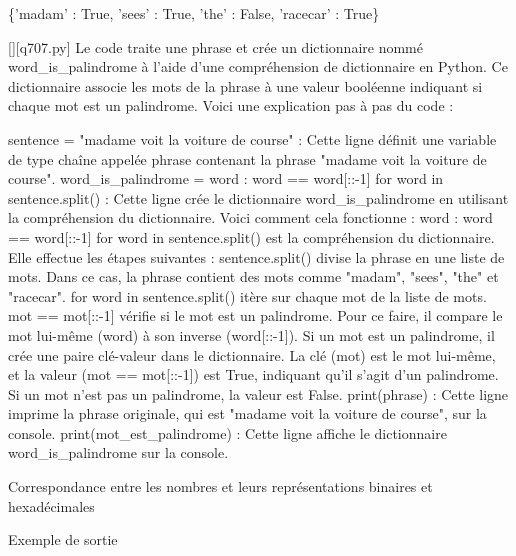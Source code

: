 \{'madam' : True, 'sees' : True, 'the' : False, 'racecar' : True\}
        \par
        \begin{solution}
            \renewcommand{\nomfichier}{q707.py}
            \pythonfile{\chemincode \nomfichier}[][\nomfichier]
            Le code traite une phrase et crée un dictionnaire nommé word_is_palindrome à l'aide d'une compréhension de dictionnaire en Python. Ce dictionnaire associe les mots de la phrase à une valeur booléenne indiquant si chaque mot est un palindrome. Voici une explication pas à pas du code :

    sentence = "madame voit la voiture de course" : Cette ligne définit une variable de type chaîne appelée phrase contenant la phrase "madame voit la voiture de course".
    word_is_palindrome = {word : word == word[::-1] for word in sentence.split()} : Cette ligne crée le dictionnaire word_is_palindrome en utilisant la compréhension du dictionnaire. Voici comment cela fonctionne :
        {word : word == word[::-1] for word in sentence.split()} est la compréhension du dictionnaire. Elle effectue les étapes suivantes :
        sentence.split() divise la phrase en une liste de mots. Dans ce cas, la phrase contient des mots comme "madam", "sees", "the" et "racecar".
        for word in sentence.split() itère sur chaque mot de la liste de mots.
        mot == mot[::-1] vérifie si le mot est un palindrome. Pour ce faire, il compare le mot lui-même (word) à son inverse (word[::-1]).
        Si un mot est un palindrome, il crée une paire clé-valeur dans le dictionnaire. La clé (mot) est le mot lui-même, et la valeur (mot == mot[::-1]) est True, indiquant qu'il s'agit d'un palindrome.
        Si un mot n'est pas un palindrome, la valeur est False.
    print(phrase) : Cette ligne imprime la phrase originale, qui est "madame voit la voiture de course", sur la console.
    print(mot_est_palindrome) : Cette ligne affiche le dictionnaire word_is_palindrome sur la console.
        \end{solution}
        

        \question
        Correspondance entre les nombres et leurs représentations binaires et hexadécimales

Exemple de sortie

